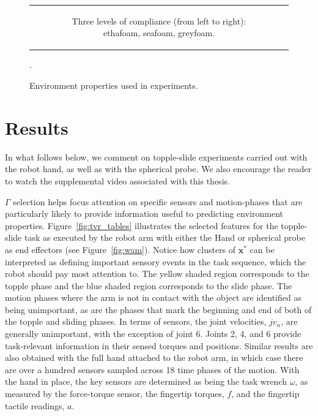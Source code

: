 \begin{figure}[]
\begin{tabular}{c}
\begin{subfigure}[]{1\linewidth}
            \caption{Three levels of compliance (from left to right): ethafoam, seafoam, greyfoam.}
        \end{subfigure}
    \end{tabular}
    \caption{Environment properties used in experiments.}.
    \label{fig:vis_properties}
\end{figure}

\section{Results}
In what follows below, we comment on topple-slide experiments carried out with the robot hand, as well as with the spherical probe.
We also encourage the reader to watch the supplemental video associated with this thesis.


$\Gamma$ selection helps focus attention on specific sensors and motion-phases that are particularly likely to provide information useful to predicting environment properties.
Figure~\ref{fig:tvr_tables} illustrates the selected features for the topple-slide task as executed by the robot arm with either the Hand or spherical probe as end effectors (see Figure~\ref{fig:wam}).
Notice how clusters of $\mathbf{x}^*$ can be interpreted as defining important sensory events in the task sequence, which the robot should pay most attention to.
The yellow shaded region corresponds to the topple phase and the blue shaded region corresponds to the slide phase.
The motion phases where the arm is not in contact with the object are identified as being unimportant, as are the phases that mark the beginning and end of both of the topple and sliding phases.
In terms of sensors, the joint velocities, $jv_n$, are generally unimportant, with the exception of joint 6. 
Joints 2, 4, and 6 provide task-relevant information in their sensed torques and positions.
Similar results are also obtained with the full hand attached to the robot arm, in which case there are over a hundred sensors sampled across 18 time phases of the motion.
With the hand in place, the key sensors are determined as being the task wrench $\omega$, as measured by the force-torque sensor, the fingertip torques, $f$, and the fingertip tactile readings, $a$.

